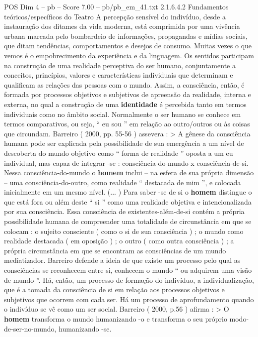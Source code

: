 \begin{textsample}{POS Dim 4 – pb – Score 7.00 – pb/pb\_em\_41.txt}  \label{ex:f4_pos_267}
2.1.6.4.2 Fundamentos teóricos/específicos do Teatro A percepção sensível do indivíduo, desde a instauração dos ditames da vida moderna, está comprimida por uma vivência urbana marcada pelo bombardeio de informações, propagandas e mídias sociais, que ditam tendências, comportamentos e desejos de consumo.
Muitas vezes o que vemos é o empobrecimento da experiência e da linguagem.
Os sentidos participam na construção de uma realidade perceptiva do ser humano, conjuntamente a conceitos, princípios, valores e características individuais que determinam e qualificam as relações das pessoas com o mundo.
Assim, a consciência, então, é formada por processos objetivos e subjetivos de apreensão da realidade, interna e externa, no qual a construção de uma \textbf{identidade} é percebida tanto em termos individuais como no âmbito social.
Normalmente o ser humano se conhece em termos comparativos, ou seja, “ eu sou ” em relação ao outro/outros ou às coisas que circundam.
Barreiro ( 2000, pp. 55-56 ) assevera : > A gênese da consciência humana pode ser explicada pela possibilidade de sua emergência a um nível de descoberta do mundo objetivo como “ forma de realidade ” oposta a um eu individual, mas capaz de integrar -se : consciência-do-mundo x consciência-de-si.
Nessa consciência-do-mundo o \textbf{homem} inclui – na esfera de sua própria dimensão – uma consciência-do-outro, como realidade “ destacada de mim ”, e colocada inicialmente em um mesmo nível. (... ) Para saber -se de si o \textbf{homem} distingue o que está fora ou além deste “ si ” como uma realidade objetiva e intencionalizada por sua consciência.
Essa consciência de existentes-além-de-si contém a própria possibilidade humana de compreender uma totalidade de circunstância em que se colocam : o sujeito consciente ( como o si de sua consciência ) ; o mundo como realidade destacada ( em oposição ) ; o outro ( como outra consciência ) ; a própria circunstância em que se encontram as consciências de um mundo mediatizador.
Barreiro defende a ideia de que existe um processo pelo qual as consciências se reconhecem entre si, conhecem o mundo “ ou adquirem uma visão de mundo ”.
Há, então, um processo de formação do indivíduo, a individualização, que é a tomada da consciência de si em relação aos processos objetivos e subjetivos que ocorrem com cada ser.
Há um processo de aprofundamento quando o indivíduo se vê como um ser social.
Barreiro ( 2000, p.56 ) afirma : > O \textbf{homem} transforma o mundo humanizando -o e transforma o seu próprio modo-de-ser-no-mundo, humanizando -se.

\end{textsample}
